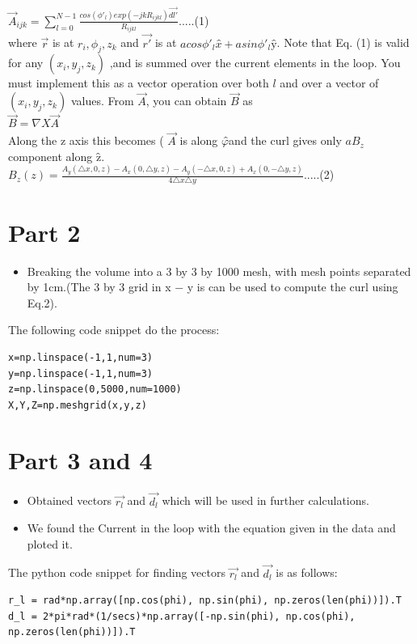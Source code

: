 \documentclass[11pt, a4paper]{article}
\begin{document}
$\vec{A}_{ijk} = \sum\limits^{N-1}_{l=0} \frac{cos(\phi'_l)exp(-jkR_{ijkl})\vec{dl'}}{R_{ijkl}}$.....(1)
\\

where $\vec{r}$ is at $r_i,\phi_j,z_k$ and $\vec{r'}$ is at $acos\phi'_l x̂ + asin\phi'_l ŷ$. Note that Eq. (1) is valid for any $(x_i,y_j,z_k)$ ,and is summed over the current elements in the loop. You must implement this as a vector operation over both $l$ and over a vector of $(x_i,y_j,z_k)$ values.
From $\vec{A}$, you can obtain $\vec{B}$ as\\

 $\vec{B} = \nabla X \vec{A}$
\\

Along the z axis this becomes ( $\vec{A}$ is along $φ̂ $and the curl gives only $aB_z$ component along $ẑ$.\\

$B_z(z) =\frac{A_y(\triangle x,0,z) - A_x (0,\triangle y,z) - A_y(-\triangle x,0,z) + A_x(0, −\triangle y, z)}{4\triangle x\triangle y}$.....(2)


\section*{Part 2}
\begin{itemize}
\item Breaking the volume into a 3 by 3 by 1000 mesh, with mesh points separated by 1cm.(The 3 by 3 grid in x − y is can be used to compute the curl using Eq.2).
\end{itemize}
The following code snippet do the process:
\begin{verbatim}	
x=np.linspace(-1,1,num=3)
y=np.linspace(-1,1,num=3)
z=np.linspace(0,5000,num=1000)
X,Y,Z=np.meshgrid(x,y,z)
\end{verbatim}
   
   
\section*{Part 3 and 4}
\begin{itemize}
\item Obtained vectors $\vec{r_l}$ and $\vec{d_l}$ which will be used in further calculations.
\item We found the Current in the loop with the equation given in the data and ploted it.
\end{itemize}

The python code snippet for finding vectors $\vec{r_l}$ and $\vec{d_l}$ is as follows:
\begin{verbatim}	
r_l = rad*np.array([np.cos(phi), np.sin(phi), np.zeros(len(phi))]).T
d_l = 2*pi*rad*(1/secs)*np.array([-np.sin(phi), np.cos(phi), np.zeros(len(phi))]).T
\end{verbatim}
\end{document}
